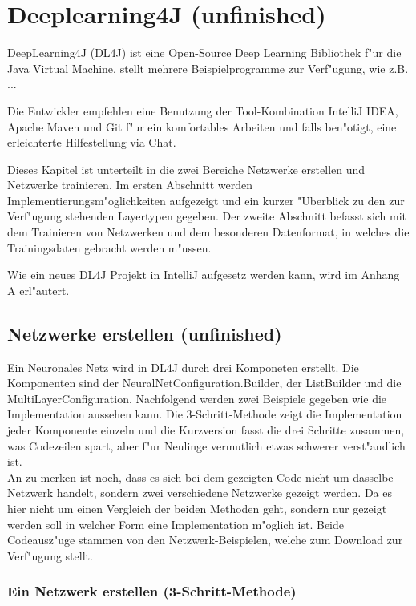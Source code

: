 \chapter{Deeplearning4J (unfinished)}
{
DeepLearning4J (DL4J) ist eine Open-Source Deep Learning Bibliothek f"ur die Java Virtual Machine. \cite{DL4J} stellt mehrere Beispielprogramme zur Verf"ugung, wie z.B. ...

Die Entwickler empfehlen eine Benutzung der Tool-Kombination IntelliJ IDEA, Apache Maven und Git f"ur ein komfortables Arbeiten und  falls ben"otigt, eine erleichterte Hilfestellung via Chat.

Dieses Kapitel ist unterteilt in die zwei Bereiche Netzwerke erstellen und Netzwerke trainieren. Im ersten Abschnitt werden Implementierungsm"oglichkeiten aufgezeigt und ein kurzer "Uberblick zu den zur Verf"ugung stehenden Layertypen gegeben. Der zweite Abschnitt befasst sich mit dem Trainieren von Netzwerken und dem besonderen Datenformat, in welches die Trainingsdaten gebracht werden m"ussen.

Wie ein neues DL4J Projekt in IntelliJ aufgesetz werden kann, wird im Anhang A erl"autert.


\section{Netzwerke erstellen (unfinished)}
Ein Neuronales Netz wird in DL4J durch drei Komponeten erstellt. Die Komponenten sind der NeuralNetConfiguration.Builder, der ListBuilder und die MultiLayerConfiguration. Nachfolgend werden zwei Beispiele gegeben wie die Implementation aussehen kann. Die 3-Schritt-Methode zeigt die Implementation jeder Komponente einzeln und die Kurzversion fasst die drei Schritte zusammen, was Codezeilen spart, aber f"ur Neulinge vermutlich etwas schwerer verst"andlich ist.\\
An zu merken ist noch, dass es sich bei dem gezeigten Code nicht um dasselbe Netzwerk handelt, sondern zwei verschiedene Netzwerke gezeigt werden. Da es hier nicht um einen Vergleich der beiden Methoden geht, sondern nur gezeigt werden soll in welcher Form eine Implementation m"oglich ist. Beide Codeausz"uge stammen von den Netzwerk-Beispielen, welche \cite{DL4J} zum Download zur Verf"ugung stellt.

\subsection{Ein Netzwerk erstellen (3-Schritt-Methode)}

}
